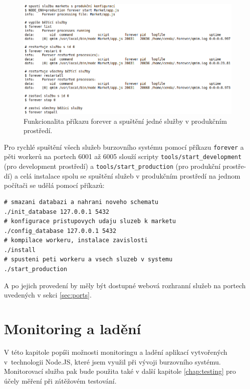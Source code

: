\documentclass[thesis=M,czech]{FITthesis}[2012/06/26]
\begin{document}
	
\begin{figure}[h]
	\centering
	\includegraphics[width=1\textwidth]{images/forever_usage}
 	\caption[Spuštění služby v produkčním prostředí a příkaz forever]{Funkcionalita příkazu forever a spuštění jedné služby v produkčním prostředí.}
 	\label{fig:forever_usage}
\end{figure}

	
	Pro rychlé spuštění všech služeb burzovního systému pomocí příkazu \texttt{forever} a pěti workerů na portech 6001 až 6005 slouží scripty \texttt{tools/start\_development} (pro development prostředí) a \texttt{tools/start\_production} (pro produkční prostře- dí) a celá instalace spolu se spuštění služeb v produkčním prostředí na jednom počítači se udělá pomocí příkazů:
	
\begin{lstlisting}[basicstyle={\tiny\ttfamily}, frame=single]
# smazani databazi a nahrani noveho schematu
./init_database 127.0.0.1 5432
# konfigurace pristupovych udaju sluzeb k marketu
./config_database 127.0.0.1 5432
# kompilace workeru, instalace zavislosti
./install
# spusteni peti workeru a vsech sluzeb v systemu
./start_production
\end{lstlisting}	
	
	A po jejich provedení by měly být dostupné webová rozhranní služeb na portech uvedených v sekci \ref{sec:ports}.
	
\chapter{Monitoring a ladění}
\label{chap:monitoring}

	V této kapitole popíši možnosti monitoringu a ladění aplikací vytvořených v~technologii Node.JS, které jsem využil při vývoji burzovního systému. Monitorovací služba pak bude použita také v další kapitole \ref{chap:testing} pro účely měření při zátěžovém testování.
	
\end{document}
